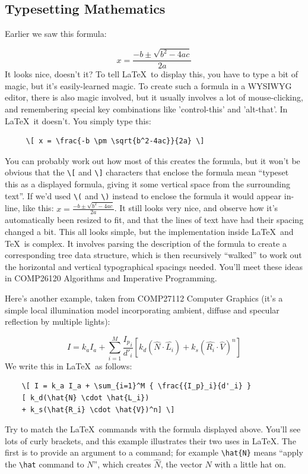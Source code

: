\begin{refsection}
\subsection{Typesetting Mathematics}
\label{mathssection}

Earlier we saw this formula:

\[ x = \frac{-b \pm \sqrt{b^2-4ac}}{2a} \]
It looks nice, doesn't it? To tell \LaTeX\ to display this, you have to type a bit of magic, but it's easily-learned magic. To create such a formula in a WYSIWYG editor, there is also magic involved, but it usually involves a lot of mouse-clicking, and remembering special key combinations like 'control-this' and 'alt-that'. In \LaTeX\ it doesn't. You simply type this:
\begin{verbatim}
     \[ x = \frac{-b \pm \sqrt{b^2-4ac}}{2a} \]
\end{verbatim}
You can probably work out how most of this creates the formula, but it won't be obvious that the \verb|\[| and  \verb|\]| characters that enclose the formula mean ``typeset this as a displayed formula, giving it some vertical space from the surrounding text''. If we'd used \verb|\(| and \verb|\)| instead to enclose the formula it would appear in-line, like this: \(  x = \frac{-b \pm \sqrt{b^2-4ac}}{2a} \). It still looks very nice, and observe how it's automatically been resized to fit, and that the lines of text have had their spacing changed a bit. This all looks simple, but the implementation inside \LaTeX\ and \TeX\ is complex. It involves parsing the description of the formula to create a corresponding tree data structure, which is then recursively ``walked'' to work out the horizontal and vertical typographical spacings needed. You'll meet these ideas in COMP26120 Algorithms and Imperative Programming.

Here's another example, taken from COMP27112 Computer Graphics (it's a simple local illumination model incorporating ambient, diffuse and specular reflection by multiple lights):

\[ I = k_a I_a + \sum_{i=1}^M {\frac{{I_p}_i}{d'_i}} [ k_d(\hat{N}\cdot\hat{L_i}) + k_s(\hat{R_i}\cdot\hat{V})^n] \]
%
We write this in \LaTeX\ as follows:

\begin{verbatim}
    \[ I = k_a I_a + \sum_{i=1}^M { \frac{{I_p}_i}{d'_i} }
    [ k_d(\hat{N} \cdot \hat{L_i}) 
    + k_s(\hat{R_i} \cdot \hat{V})^n] \]
\end{verbatim}
%
Try to match the \LaTeX\ commands with the formula displayed above. You'll see lots of curly brackets, and this example illustrates their two uses in \LaTeX. The first is to provide an argument to a command; for example \verb|\hat{N}| means ``apply the \verb|\hat| command to $N$'', which creates \(\hat{N}\), the vector \( N \) with a little hat  on.  


\end{refsection}
